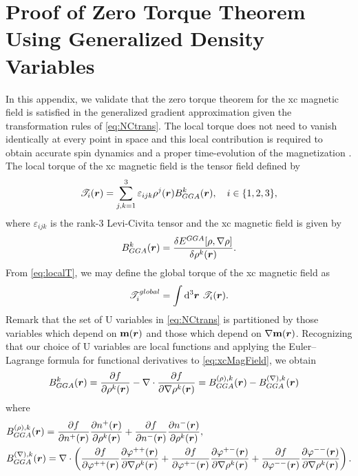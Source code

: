 \chapter{Proof of Zero Torque Theorem Using Generalized Density Variables} \label{apx:ZeroTorque}

In this appendix, we validate that the zero torque theorem for the xc magnetic field is satisfied in the generalized gradient approximation
given the transformation rules of \cref{eq:NCtrans}. 
The local torque does not need to vanish identically at every point in space and this local contribution is required to obtain accurate spin dynamics and a proper time-evolution of the magnetization \cite{Gyorffy01_206403,Gyorffy03_354,Frisch07_125119,Frisch12_2193,Scuseria13_035117,Li17_2591}.
The local torque of the xc magnetic field is the tensor field defined by \cite{Gyorffy01_206403}
\begin{equation}
\label{eq:localT}
\mathscr{T}_i(\boldsymbol{r}) = \sum_{j,k = 1}^3 \varepsilon_{ijk} \rho^j(\boldsymbol{r}) B_{GGA}^k(\boldsymbol{r}), \quad i \in \{1,2,3\},
\end{equation}
where $\varepsilon_{ijk}$ is the rank-3 Levi-Civita tensor and the xc magnetic field is given by
\begin{equation}
\label{eq:xcMagField}
B_{GGA}^k(\boldsymbol{r}) = \frac{\delta E^{GGA}[\rho,\nabla\rho]}{\delta \rho^k(\boldsymbol{r})} .
\end{equation}
From \cref{eq:localT}, we may define the global torque of the xc magnetic field as
\begin{equation}
\mathscr{T}_i^{global} = \int \mathrm{d}^3 \boldsymbol{r} \text{ } \mathscr{T}_i(\boldsymbol{r}) .
\end{equation}
Remark that the set of U variables in \cref{eq:NCtrans} is partitioned by those variables which depend on
$\mathbf{m}(\boldsymbol{r})$ and those which depend on $\nabla\mathbf{m}(\boldsymbol{r})$. Recognizing that our choice of U variables
are local functions and
applying the Euler--Lagrange formula for functional derivatives to \cref{eq:xcMagField}, we obtain
\begin{align}
B_{GGA}^{k}(\boldsymbol{r}) &= \frac{\partial f}{\partial \rho^k(\boldsymbol{r})} - \nabla \cdot \frac{\partial f}{\partial \nabla \rho^k(\boldsymbol{r})}  = B^{(\rho),k}_{GGA}(\boldsymbol{r}) - B^{(\nabla),k}_{GGA}(\boldsymbol{r})
\end{align}
where
\begin{align}
&B^{(\rho),k}_{GGA}(\boldsymbol{r}) = \frac{\partial f}{\partial n^+(\boldsymbol{r})} \frac{\partial n^+(\boldsymbol{r})}{\partial \rho^k(\boldsymbol{r})} + 
  \frac{\partial f}{\partial n^-(\boldsymbol{r})} \frac{\partial n^-(\boldsymbol{r})}{\partial \rho^k(\boldsymbol{r})} \label{eq:BxcR}, \\ 
&B^{(\nabla),k}_{GGA}(\boldsymbol{r})= \nabla \cdot 
  \left(
    \frac{\partial f}{\partial \varphi^{++}(\boldsymbol{r})}\frac{\partial \varphi^{++}(\boldsymbol{r})}{\partial \nabla \rho^k(\boldsymbol{r})} + 
    \frac{\partial f}{\partial \varphi^{+-}(\boldsymbol{r})}\frac{\partial \varphi^{+-}(\boldsymbol{r})}{\partial \nabla \rho^k(\boldsymbol{r})} + 
    \frac{\partial f}{\partial \varphi^{--}(\boldsymbol{r})}\frac{\partial \varphi^{--}(\boldsymbol{r})}{\partial \nabla \rho^k(\boldsymbol{r})}   
  \right) . \label{eq:BxcGR}
\end{align}
